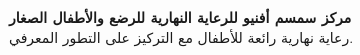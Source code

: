 {\textbf{مركز سمسم أفنيو للرعاية النهارية للرضع والأطفال الصغار}}\\
رعاية نهارية رائعة للأطفال مع التركيز على التطور المعرفي.\\
